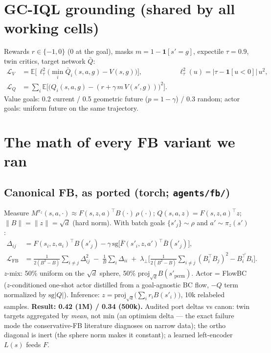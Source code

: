 \documentclass[11pt]{article}
\newcommand{\E}{\mathbb{E}}
\newcommand{\sg}{\mathrm{sg}}
\begin{document}
\section{GC-IQL grounding (shared by all working cells)}\label{sec:iql}
Rewards $r\in\{-1,0\}$ ($0$ at the goal), masks $m=1-\mathbf 1[s'{=}g]$, expectile $\tau=0.9$,
twin critics, target network $\bar Q$:
\begin{align}
\mathcal L_V &= \E\big[\,\ell_\tau^2\big(\min_i \bar Q_i(s,a,g) - V(s,g)\big)\big],
&& \ell_\tau^2(u) = |\tau - \mathbf 1[u<0]|\,u^2,\\
\mathcal L_Q &= \textstyle\sum_i \E\big[\big(Q_i(s,a,g) - (r + \gamma\, m\, V(s',g))\big)^2\big].
\end{align}
Value goals: 0.2 current / 0.5 geometric future ($p{=}1{-}\gamma$) / 0.3 random; actor goals:
uniform future on the same trajectory.

\section{The math of every FB variant we ran}\label{sec:variants}

\subsection{Canonical FB, as ported (torch; \texttt{agents/fb/})}
Measure $M^{\pi_z}(s,a,\cdot)\approx F(s,z,a)^\top B(\cdot)\,\rho(\cdot)$;
$Q(s,a,z)=F(s,z,a)^\top z$; $\|B\|=\|z\|=\sqrt d$ (hard norm). With batch goals
$\{s'_j\}\sim\rho$ and $a'\sim\pi_z(s')$:
\begin{align}
\Delta_{ij} &= F(s_i,z,a_i)^\top B(s'_j) - \gamma\,\sg\!\big[\bar F(s'_i,z,a')^\top \bar B(s'_j)\big],\\
\mathcal L_{\mathrm{FB}} &= \frac{1}{2(B^2{-}B)}\sum_{i\neq j}\Delta_{ij}^2 \;-\;
\frac1B\sum_i \Delta_{ii}
\;+\; \lambda_\perp \Big[\tfrac{1}{2(B^2-B)}\textstyle\sum_{i\neq j}(B_i^\top B_j)^2 - \overline{B_i^\top B_i}\Big].
\end{align}
$z$-mix: 50\% uniform on the $\sqrt d$ sphere, 50\% $\mathrm{proj}_{\sqrt d} B(s'_{\mathrm{perm}})$.
Actor = FlowBC ($z$-conditioned one-shot actor distilled from a goal-agnostic BC flow, $-Q$
term normalized by $\sg|Q|$). Inference: $z=\mathrm{proj}_{\sqrt d}\big(\sum_i r_i B(s'_i)\big)$,
10k relabeled samples. \textbf{Result: 0.42 (1M) / 0.34 (500k).} Audited port deltas vs canon:
twin targets aggregated by \emph{mean}, not min (an optimism delta --- the exact failure mode
the conservative-FB literature diagnoses on narrow data); the ortho diagonal is inert (the
sphere norm makes it constant); a learned left-encoder $L(s)$ feeds $F$.
\end{document}
